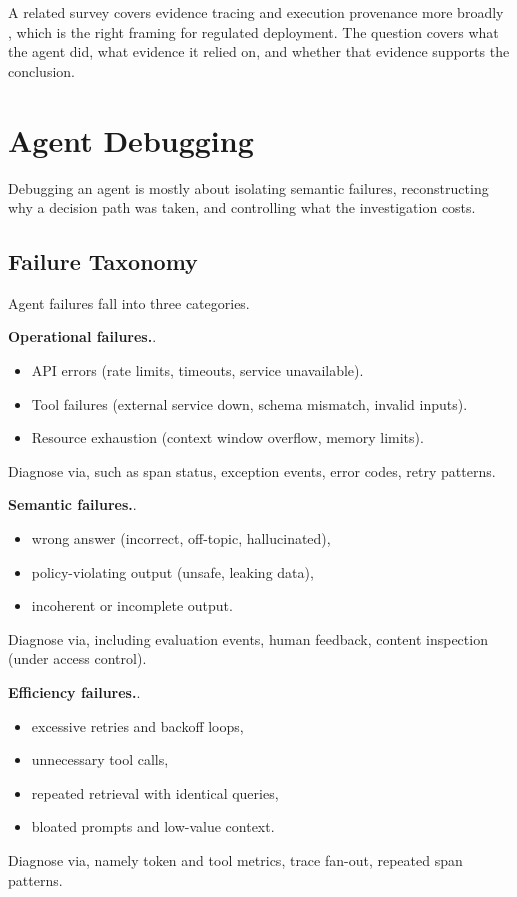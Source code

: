 A related survey covers evidence tracing and execution provenance more broadly
\cite{provenance2026}, which is the right framing for regulated deployment. The question covers what the agent did, what evidence it relied on, and whether that evidence supports the conclusion.

\section{Agent Debugging}

Debugging an agent is mostly about isolating semantic failures, reconstructing why a decision path was taken, and controlling what the
investigation costs.

\subsection{Failure Taxonomy}

Agent failures fall into three categories.

\textbf{Operational failures.}.
\begin{itemize}
\item API errors (rate limits, timeouts, service unavailable).
\item Tool failures (external service down, schema mismatch, invalid inputs).
\item Resource exhaustion (context window overflow, memory limits).
\end{itemize}
Diagnose via, such as span status, exception events, error codes, retry patterns.

\textbf{Semantic failures.}.
\begin{itemize}
\item wrong answer (incorrect, off-topic, hallucinated),
\item policy-violating output (unsafe, leaking data),
\item incoherent or incomplete output.
\end{itemize}
Diagnose via, including evaluation events, human feedback, content inspection (under access control).

\textbf{Efficiency failures.}.
\begin{itemize}
\item excessive retries and backoff loops,
\item unnecessary tool calls,
\item repeated retrieval with identical queries,
\item bloated prompts and low-value context.
\end{itemize}
Diagnose via, namely token and tool metrics, trace fan-out, repeated span patterns.

